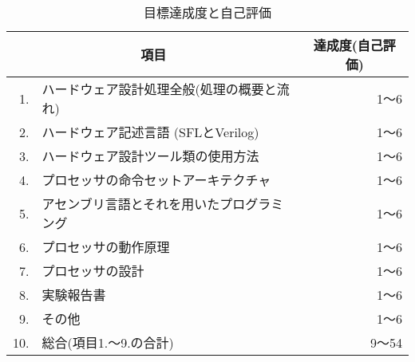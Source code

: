 \begin{table}[htb]
\caption{目標達成度と自己評価}
\label{tab:目標達成度と自己評価}
\begin{center}
{\small
\begin{tabular}{rl|r}
\hline
\hline
\multicolumn{2}{c|}{項目} & \multicolumn{1}{c}{達成度(自己評価)} \\
\hline
1. & ハードウェア設計処理全般(処理の概要と流れ) & 1〜6 \\
2. & ハードウェア記述言語 (SFLとVerilog) & 1〜6 \\
3. & ハードウェア設計ツール類の使用方法 & 1〜6 \\
4. & プロセッサの命令セットアーキテクチャ & 1〜6 \\
5. & アセンブリ言語とそれを用いたプログラミング & 1〜6 \\
6. & プロセッサの動作原理 & 1〜6 \\
7. & プロセッサの設計 & 1〜6 \\
8. & 実験報告書 & 1〜6 \\
9. & その他 & 1〜6 \\
\hline
10. & 総合(項目1.〜9.の合計) & 9〜54 \\
\hline
\end{tabular}
}
\end{center}
\end{table}
